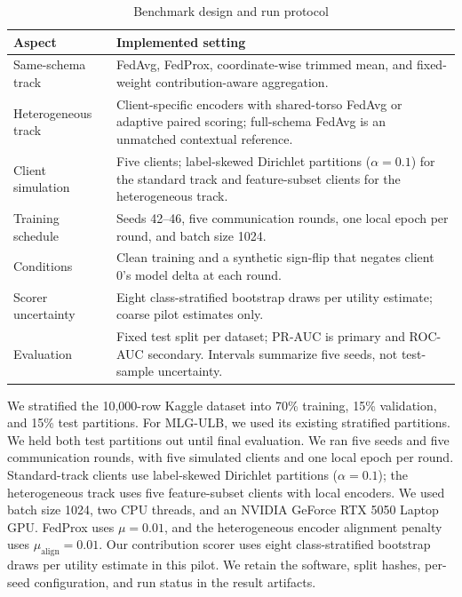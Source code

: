 \documentclass{ieeeaccess}
\begin{document}
\begin{table}[t]
\caption{Benchmark design and run protocol}
\label{tab:bas1-design}
\centering
\begin{tabular}{p{}p{}}
\toprule
Aspect & Implemented setting \\
\midrule
Same-schema track & FedAvg, FedProx, coordinate-wise trimmed mean, and fixed-weight contribution-aware aggregation. \\
Heterogeneous track & Client-specific encoders with shared-torso FedAvg or adaptive paired scoring; full-schema FedAvg is an unmatched contextual reference. \\
Client simulation & Five clients; label-skewed Dirichlet partitions ($\alpha=0.1$) for the standard track and feature-subset clients for the heterogeneous track. \\
Training schedule & Seeds 42--46, five communication rounds, one local epoch per round, and batch size 1024. \\
Conditions & Clean training and a synthetic sign-flip that negates client 0's model delta at each round. \\
Scorer uncertainty & Eight class-stratified bootstrap draws per utility estimate; coarse pilot estimates only. \\
Evaluation & Fixed test split per dataset; PR-AUC is primary and ROC-AUC secondary. Intervals summarize five seeds, not test-sample uncertainty. \\
\bottomrule
\end{tabular}
\end{table}


We stratified the 10,000-row Kaggle dataset into 70\% training, 15\%
validation, and 15\% test partitions. For MLG-ULB, we used its existing
stratified partitions. We held both test partitions out until final evaluation.
We ran five seeds and five communication rounds, with five simulated clients
and one local epoch per round. Standard-track clients use label-skewed
Dirichlet partitions ($\alpha=0.1$); the heterogeneous track uses five
feature-subset clients with local encoders. We used batch size 1024, two CPU
threads, and an NVIDIA GeForce RTX 5050 Laptop GPU. FedProx uses $\mu=0.01$,
and the heterogeneous encoder alignment penalty uses
$\mu_{\mathrm{align}}=0.01$. Our contribution scorer uses eight
class-stratified bootstrap draws per utility estimate in this pilot. We retain
the software, split hashes, per-seed configuration, and run status in the
result artifacts.
\end{document}
